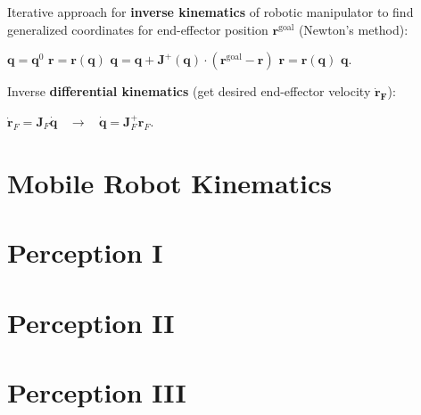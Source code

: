 \documentclass[8pt,landscape]{article}
\newcommand{\vmspace}{\vspace{-7pt}}
\newcommand{\vpspace}{\vspace{9pt}}
\begin{document}
\begin{multicols}{3}
\vpspace

\begin{minipage}{\columnwidth}
  Iterative approach for \textbf{inverse kinematics} of robotic manipulator to
  find generalized coordinates for end-effector position $\mathbf r^\text{goal}$
  (Newton's method):\\
  \vmspace
  \begin{algorithm}[H]
    $\mathbf q = \mathbf q^0$\;
    $\mathbf r = \mathbf r(\mathbf q)$\;
    {
    $\mathbf q = \mathbf q + \mathbf J^+(\mathbf q) \cdot (\mathbf r^\text{goal}
    - \mathbf r)$\;
    $\mathbf r = \mathbf r ( \mathbf q )$\;
    }
    \Return $\mathbf q$.
  \end{algorithm}
\end{minipage}

\vpspace

\begin{minipage}{\columnwidth}
  Inverse \textbf{differential kinematics} (get desired end-effector velocity
  $\mathbf{\dot{r}_F}$):
  \vmspace
  \begin{center}
    $\mathbf{\dot r}_F = \mathbf J_F \mathbf{\dot q}$
    $\;\;\rightarrow\;\;$
    $\mathbf{\dot q} = \mathbf J_F^+ \mathbf r_F.$
  \end{center}
\end{minipage}


\section{Mobile Robot Kinematics}

\blindtext[3]

\section{Perception I}

\blindtext[3]

\section{Perception II}

\blindtext[3]

\section{Perception III}


\end{multicols}
\end{document}
